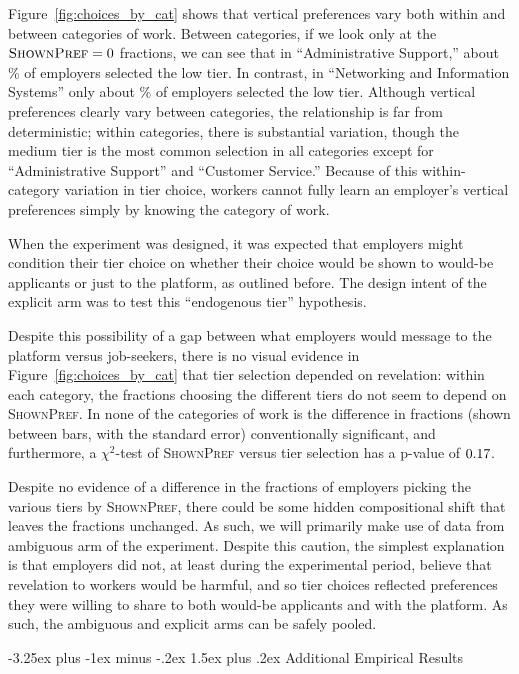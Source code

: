 \documentclass[12pt]{article}
\makeatletter
\renewcommand{\subsection}{%
  \@startsection{subsection}{2}{\z@}%
  {-3.25ex plus -1ex minus -.2ex}%
  {1.5ex plus .2ex}%
  {\normalfont\large\bfseries}%
}
\makeatother
\begin{document}
Figure~\ref{fig:choices_by_cat} shows that vertical preferences vary both within and between categories of work.
Between categories, if we look only at the $\textsc{ShownPref} = 0$ fractions, we can see that in ``Administrative Support,'' about \fracLowAdminSpt{}\% of employers selected the low tier.
In contrast, in ``Networking and Information Systems'' only about \fracLowNetworking{}\% of employers selected the low tier.
Although vertical preferences clearly vary between categories, the relationship is far from deterministic;
within categories, there is substantial variation, though the medium tier is the most common selection in all categories except for ``Administrative Support'' and ``Customer Service.''
Because of this within-category variation in tier choice, workers cannot fully learn an employer's vertical preferences simply by knowing the category of work.

When the experiment was designed, it was expected that employers might condition their tier choice on whether their choice would be shown to would-be applicants or just to the platform, as outlined before. The design intent of the explicit arm was to test this ``endogenous tier'' hypothesis.

Despite this possibility of a gap between what employers would message to the platform versus job-seekers, there is no visual evidence in Figure~\ref{fig:choices_by_cat} that tier selection depended on revelation:
within each category, the fractions choosing the different tiers do not seem to depend on \textsc{ShownPref}.
In none of the categories of work is the difference in fractions (shown between bars, with the standard error) conventionally significant, and furthermore, a $\chi^2$-test of \textsc{ShownPref} versus tier selection has a p-value of $0.17{}$.

Despite no evidence of a difference in the fractions of employers picking the various tiers by \textsc{ShownPref}, there could be some hidden compositional shift that leaves the fractions unchanged.
As such, we will primarily make use of data from ambiguous arm of the experiment.
Despite this caution, the simplest explanation is that employers did not, at least during the experimental period, believe that revelation to workers would be harmful, and so tier choices reflected preferences they were willing to share to both would-be applicants and with the platform.
As such, the ambiguous and explicit arms can be safely pooled.

\subsection{Additional Empirical Results}\label{online_app:additional_empirical}
\end{document}
